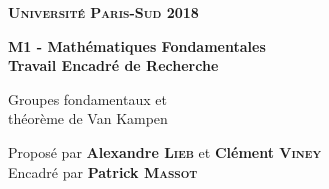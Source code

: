 \documentclass{article}[a4paper, twoside]
\begin{document}
	\onehalfspacing %
	
	\theoremstyle{plain}
	\newtheorem{theo}{Théorème}
	\newtheorem{prop}{Proposition}
	\newtheorem{coro}{Corollaire}
	\newtheorem*{lemm}{Lemme}
	
	\theoremstyle{definition}
	\newtheorem{defi}{Définition}
	
    \begin{titlepage}
		\thispagestyle{empty}
		\vspace*{2cm}
		{\Huge\bf \textsc{Université Paris-Sud} \hfill 2018}
		\vspace*{2cm}
		\begin{center}
			{\Huge\bf M1 - Mathématiques Fondamentales\\
			Travail Encadré de Recherche\par
			\vspace*{4cm}
			Groupes fondamentaux et\\ théorème de Van Kampen}
		\end{center}
		\vspace*{8cm}
		{\Large Proposé par \textbf{Alexandre \textsc{Lieb}} et \textbf{Clément \textsc{Viney}} 
		\\\hfill Encadré par \textbf{Patrick \textsc{Massot}}}
	\end{titlepage}
	
	\renewcommand{\contentsname}{Sommaire}
	\setcounter{tocdepth}{1}
	\tableofcontents
	\newpage{}
	
	
	
	
	
	
\end{document}
